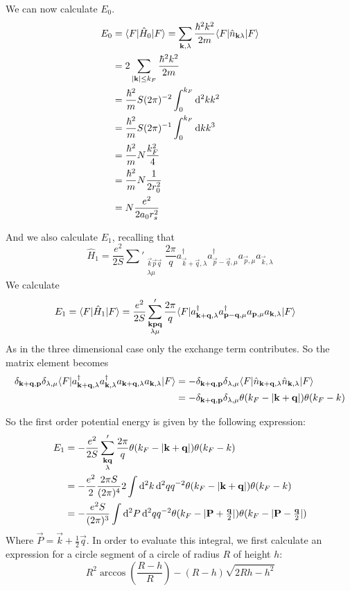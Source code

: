 We can now calculate $E_0$.
\begin{align*}
 E_0 &= \braket[\hat{H}_0]{F}{F} = \sum_{\vec{k},\lambda} \frac{\hbar^2 k^2}{2m}\braket[\hat{n}_{\vec{k}\lambda}]{F}{F} \\
 &= 2\sum_{|\vec{k}|\leq k_F} \frac{\hbar^2 k^2}{2m} \\
 &= \frac{\hbar^2}{m} S (2\pi)^{-2} \int_0^{k_F} \diff{^2k}k^2 \\
 &= \frac{\hbar^2}{m} S (2\pi)^{-1} \int_0^{k_F} \diff{k}k^3 \\
 &= \frac{\hbar^2}{m} N \frac{k_F^2}{4} \\
 &= \frac{\hbar^2}{m}N\frac{1}{2r_0^2} \\
 &= N\frac{e^2}{2a_0r_s^2}
\end{align*}

And we also calculate $E_1$, recalling that
\[ \hat{H}_1 = \frac{e^2}{2S}\sum'_{\substack{\vec{k}\vec{p}\vec{q} \\ \lambda \mu}} \frac{2\pi}{q}a^\dagger_{\vec{k}+ \vec{q}, \lambda} a^\dagger_{\vec{p}- \vec{q}, \mu}a_{\vec{p},\mu}a_{\vec{k}, \lambda} \]
We calculate
\begin{align*}
E_1 &= \braket[\hat{H}_1]{F}{F} = \frac{e^2}{2S}\sum'_{\substack{\vec{k}\vec{p}\vec{q} \\ \lambda \mu}} \frac{2\pi}{q}\braket[a^\dagger_{\vec{k}+ \vec{q}, \lambda} a^\dagger_{\vec{p}- \vec{q}, \mu}a_{\vec{p},\mu}a_{\vec{k}, \lambda}]{F}{F}
\end{align*}
As in the three dimensional case only the exchange term contributes. So the matrix element becomes
\begin{align*}
\delta_{\vec{k}+\vec{q},\vec{p}}\delta_{\lambda,\mu}\braket[a^\dagger_{\vec{k}+ \vec{q}, \lambda} a^\dagger_{\vec{k}, \lambda}a_{\vec{k}+\vec{q},\lambda}a_{\vec{k}, \lambda}]{F}{F} &= - \delta_{\vec{k}+\vec{q},\vec{p}}\delta_{\lambda,\mu}\braket[\hat{n}_{\vec{k}+ \vec{q}, \lambda} \hat{n}_{\vec{k}, \lambda}]{F}{F} \\
&= - \delta_{\vec{k}+\vec{q},\vec{p}}\delta_{\lambda,\mu}\theta(k_F - |\vec{k}+\vec{q}|)\theta(k_F - k)
\end{align*}

So the first order potential energy is given by the following expression:
\begin{align*}
E_1 &= -\frac{e^2}{2S}\sum'_{\substack{\bm{\mathrm{k}}\bm{\mathrm{q}} \\ \lambda}} \frac{2\pi}{q}\theta(k_F - |\bm{\mathrm{k}}+\bm{\mathrm{q}}|)\theta(k_F - k) \\
&= - \frac{e^2}{2}\frac{2\pi S}{(2\pi)^4}2 \int \operatorname{d \!}{^2k}\operatorname{d \!}{^2q}q^{-2} \theta(k_F - |\bm{\mathrm{k}}+\bm{\mathrm{q}}|)\theta(k_F - k) \\
&= - \frac{e^2S}{(2\pi)^3}\int \operatorname{d \!}{^2P}\operatorname{d \!}{^2q}q^{-2} \theta(k_F - |\bm{\mathrm{P}}+\tfrac{\bm{\mathrm{q}}}{2}|)\theta(k_F - |\bm{\mathrm{P}}- \tfrac{\bm{\mathrm{q}}}{2}|)
\end{align*}
Where $\vec{P} = \vec{k}+ \frac{1}{2}\vec{q}$.
In order to evaluate this integral, we first calculate an expression for a circle segment of a circle of radius $R$ of height $h$:
\[ R^2\arccos \left(\frac{R-h}{R}\right) - (R-h)\sqrt{2Rh - h^2} \]

